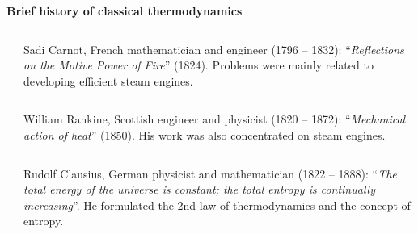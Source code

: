 \begin{frame}
\begin{center}
\textbf{Brief history of classical thermodynamics}\\
\end{center}

\scriptsize

\vspace*{-0.2cm}

\begin{columns}
\begin{column}{0.5cm}
\vspace*{-0.2cm}
\end{column}
\begin{column}{7cm}
\otext

Sadi Carnot, French mathematician and engineer (1796 -- 1832):
``\textit{Reflections on the Motive Power of Fire}'' (1824).
Problems were mainly related to developing efficient steam engines.\\
\end{column}
\end{columns}

\begin{columns}
\begin{column}{0.5cm}
\vspace*{-0.2cm}
\end{column}
\begin{column}{7cm}
\otext

William Rankine, Scottish engineer and physicist (1820 -- 1872):
``\textit{Mechanical action of heat}'' (1850).
His work was also concentrated on steam engines.\\
\end{column}
\end{columns}

\begin{columns}
\begin{column}{0.5cm}
\vspace*{-0.2cm}
\end{column}
\begin{column}{7cm}
\otext

Rudolf Clausius, German physicist and mathematician (1822 -- 1888):
``\textit{The total energy of the universe is constant; the total entropy is continually
increasing}''. He formulated the 2nd law of thermodynamics and the concept of entropy.
\end{column}
\end{columns}



\end{frame}
